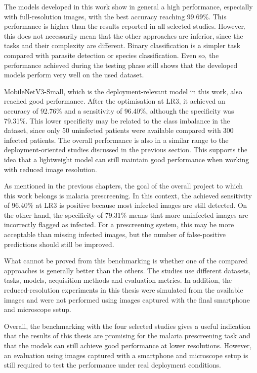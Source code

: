 The models developed in this work show in general a high performance, especially with full-resolution images, with the best accuracy reaching 99.69\%. This performance is higher than the results reported in all selected studies. However, this does not necessarily mean that the other approaches are inferior, since the tasks and their complexity are different. Binary classification is a simpler task compared with parasite detection or species classification. Even so, the performance achieved during the testing phase still shows that the developed models perform very well on the used dataset.

MobileNetV3-Small, which is the deployment-relevant model in this work, also reached good performance. After the optimisation at LR3, it achieved an accuracy of 92.76\% and a sensitivity of 96.40\%, although the specificity was 79.31\%. This lower specificity may be related to the class imbalance in the dataset, since only 50 uninfected patients were available compared with 300 infected patients. The overall performance is also in a similar range to the deployment-oriented studies discussed in the previous section. This supports the idea that a lightweight model can still maintain good performance when working with reduced image resolution.

As mentioned in the previous chapters, the goal of the overall project to which this work belongs is malaria prescreening. In this context, the achieved sensitivity of 96.40\% at LR3 is positive because most infected images are still detected. On the other hand, the specificity of 79.31\% means that more uninfected images are incorrectly flagged as infected. For a prescreening system, this may be more acceptable than missing infected images, but the number of false-positive predictions should still be improved.

What cannot be proved from this benchmarking is whether one of the compared approaches is generally better than the others. The studies use different datasets, tasks, models, acquisition methods and evaluation metrics. In addition, the reduced-resolution experiments in this thesis were simulated from the available images and were not performed using images captured with the final smartphone and microscope setup.

Overall, the benchmarking with the four selected studies gives a useful indication that the results of this thesis are promising for the malaria prescreening task and that the models can still achieve good performance at lower resolutions. However, an evaluation using images captured with a smartphone and microscope setup is still required to test the performance under real deployment conditions.

